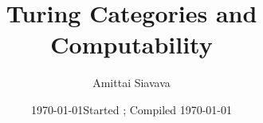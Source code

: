 

\title{%
  Turing Categories and Computability
}
\author{Amittai Siavava
}
\ifoptionfinal
  {\date{\today}}
  {\date{Started ; Compiled \today}}


\maketitle

\tableofcontents
